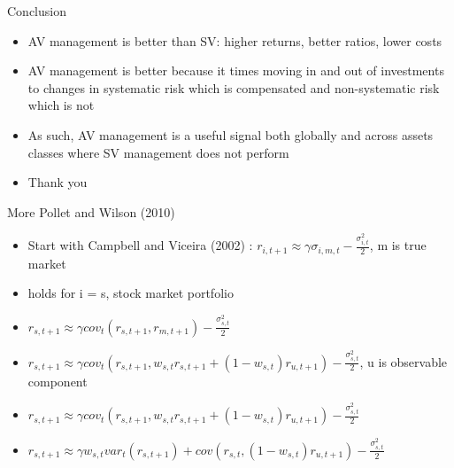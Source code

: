 \documentclass{beamer}
\begin{document}
\begin{frame}{Conclusion}
	\begin{itemize}
		\item AV management is better than SV: higher returns, better ratios, lower costs
		\item AV management is better because it times moving in and out of investments to changes in systematic risk which is compensated and non-systematic risk which is not
		\item As such, AV management is a useful signal both globally and across assets classes where SV management does not perform
		\item Thank you
	\end{itemize}
\end{frame}


\begin{frame}{More Pollet and Wilson (2010)}
	\hypertarget{PWII}{}
	\begin{itemize}
		\item Start with Campbell and Viceira (2002) : $r_{i,t+1} \approx \gamma\sigma_{i,m,t} - \frac{\sigma_{i,t}^{2}}{2}$, m is true market
		\item holds for i = s, stock market portfolio
		\item $r_{s,t+1} \approx \gamma cov_{t}(r_{s,t+1},r_{m,t+1}) - \frac{\sigma_{s,t}^{2}}{2}$ 
		\item $r_{s,t+1} \approx \gamma cov_{t}(r_{s,t+1},w_{s,t}r_{s,t+1}+(1-w_{s,t})r_{u,t+1}) - \frac{\sigma_{s,t}^{2}}{2}$, u is observable component
		\item $r_{s,t+1} \approx \gamma cov_{t}(r_{s,t+1},w_{s,t}r_{s,t+1}+(1-w_{s,t})r_{u,t+1}) - \frac{\sigma_{s,t}^{2}}{2}$ 
		\item $r_{s,t+1} \approx \gamma w_{s,t} var_{t}(r_{s,t+1})+cov(r_{s,t},(1-w_{s,t})r_{u,t+1}) - \frac{\sigma_{s,t}^{2}}{2}$ 
	\end{itemize}
\end{frame}
\end{document}
